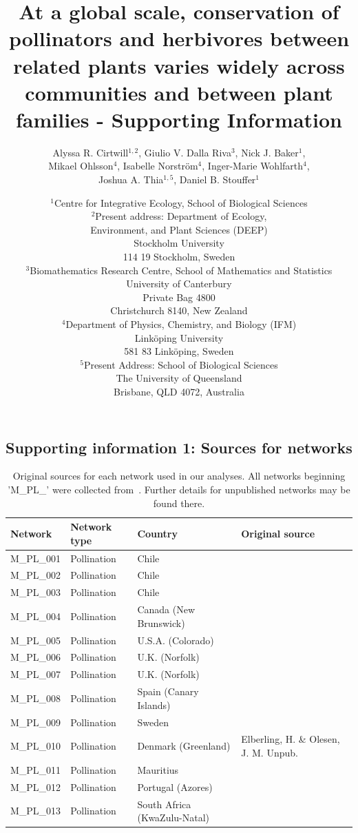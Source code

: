 \documentclass[12pt]{article}
\title{At a global scale, conservation of pollinators and herbivores between related plants varies widely across communities and between plant families - Supporting Information}
\author{Alyssa R. Cirtwill$^{1,2}$, Giulio V. Dalla Riva$^{3}$, Nick J. Baker$^{1}$,\\
Mikael Ohlsson$^{4}$, Isabelle Norstr\"{o}m$^{4}$, Inger-Marie Wohlfarth$^{4}$,\\
Joshua A. Thia$^{1,5}$, 
Daniel B. Stouffer$^{1}$}
\date{\small$^1$Centre for Integrative Ecology, School of Biological Sciences\\
\medskip$^2$Present address: Department of Ecology,\\
Environment, and Plant Sciences (DEEP)\\
Stockholm University\\
114 19 Stockholm, Sweden\\
\medskip$^3$Biomathematics Research Centre, School of Mathematics and Statistics\\
University of Canterbury\\Private Bag 4800\\
Christchurch 8140, New Zealand\\
\medskip$^4$Department of Physics, Chemistry, and Biology (IFM)\\ Link\"{o}ping University\\ 581 83 Link\"{o}ping, Sweden\\
\medskip$^5$Present Address: School of Biological Sciences\\
The University of Queensland\\Brisbane, QLD 4072, Australia }
\newcommand{\beginsupplement}{%
        \setcounter{table}{0}
        \renewcommand{\thetable}{S\arabic{table}}%
        \setcounter{figure}{0}
        \renewcommand{\thefigure}{S\arabic{figure}}%
     }
\begin{document}
\maketitle
\baselineskip=8.5mm
\begin{spacing}{1.5}

\linenumbers
\beginsupplement
\clearpage

\section*{Supporting information 1: Sources for networks}
  \begin{table}[!h]
    \caption{Original sources for each network used in our analyses. All networks beginning 'M\_PL\_' were collected from~\citet{weboflife}. Further details for unpublished networks may be found there.}
    \label{sources}
    \begin{center}
    \begin{tabular}{|l l l m{8cm} |}
    \hline
    Network & Network type & Country & Original source  \\
    \hline
    M\_PL\_001  & Pollination & Chile & \citet{Arroyo1982}  \\
    M\_PL\_002  & Pollination & Chile & \citet{Arroyo1982}  \\
    M\_PL\_003  & Pollination & Chile & \citet{Arroyo1982}  \\
    M\_PL\_004  & Pollination & Canada (New Brunswick) & \citet{Barrett1987} \\
    M\_PL\_005  & Pollination & U.S.A. (Colorado) & \citet{Clements1923}  \\
    M\_PL\_006  & Pollination & U.K. (Norfolk) & \citet{Dicks2002} \\
    M\_PL\_007  & Pollination & U.K. (Norfolk) & \citet{Dicks2002} \\
    M\_PL\_008  & Pollination & Spain (Canary Islands) & \citet{Dupont2003}  \\
    M\_PL\_009  & Pollination & Sweden & \citet{Elberling1999} \\
    M\_PL\_010  & Pollination & Denmark (Greenland) & Elberling, H. \& Olesen, J. M. Unpub. \\
    M\_PL\_011  & Pollination & Mauritius & \citet{Olesen2002a}  \\
    M\_PL\_012  & Pollination & Portugal (Azores) & \citet{Olesen2002a}  \\
    M\_PL\_013  & Pollination & South Africa (KwaZulu-Natal) & \citet{Ollerton2003}  \\

\end{tabular}
\end{center}
\end{table}
\end{spacing}
\end{document}
